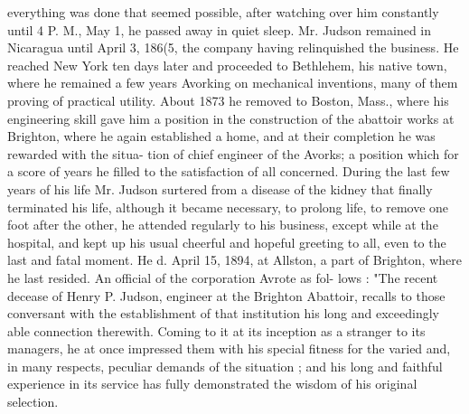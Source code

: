 \documentclass[oneside]{book}
\begin{document}
everything was done that seemed possible, after watching over 
him constantly until 4 P. M., May 1, he passed away in quiet 
sleep. Mr. Judson remained in Nicaragua until April 3, 186(5, 
the company having relinquished the business. He reached 
New York ten days later and proceeded to Bethlehem, his 
native town, where he remained a few years Avorking on 
mechanical inventions, many of them proving of practical 
utility. About 1873 he removed to Boston, Mass., where his 
engineering skill gave him a position in the construction of 
the abattoir works at Brighton, where he again established a 
home, and at their completion he was rewarded with the situa- 
tion of chief engineer of the Avorks; a position which for a 
score of years he filled to the satisfaction of all concerned. 
During the last few years of his life Mr. Judson surtered from 
a disease of the kidney that finally terminated his life, 
although it became necessary, to prolong life, to remove 
one foot after the other, he attended regularly to his business, 
except while at the hospital, and kept up his usual cheerful 
and hopeful greeting to all, even to the last and fatal moment. 
He d. April 15, 1894, at Allston, a part of Brighton, where 
he last resided. An official of the corporation Avrote as fol- 
lows : "The recent decease of Henry P. Judson, engineer 
at the Brighton Abattoir, recalls to those conversant with the 
establishment of that institution his long and exceedingly 
able connection therewith. Coming to it at its inception as a 
stranger to its managers, he at once impressed them with his 
special fitness for the varied and, in many respects, peculiar 
demands of the situation ; and his long and faithful experience in its service has fully demonstrated the wisdom of his original selection. 
\end{document}
